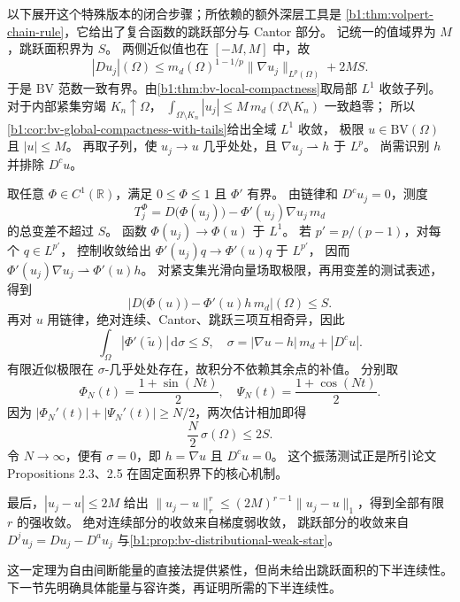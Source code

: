 \begin{proofsketch}
以下展开这个特殊版本的闭合步骤；所依赖的额外深层工具是
\cref{b1:thm:volpert-chain-rule}，它给出了复合函数的跳跃部分与 Cantor 部分。
记统一的值域界为 \(M\)，跳跃面积界为 \(S\)。
两侧近似值也在 \([-M,M]\) 中，故
\[
 |Du_j|(\Omega)
 \le m_d(\Omega)^{1-1/p}\|\nabla u_j\|_{L^p(\Omega)}
      +2M S.
\]
于是 \(\mathrm{BV}\) 范数一致有界。由\cref{b1:thm:bv-local-compactness}取局部 \(L^1\) 收敛子列。
对于内部紧集穷竭 \(K_n\uparrow\Omega\)，
\(\int_{\Omega\setminus K_n}|u_j|\le M\,m_d(\Omega\setminus K_n)\) 一致趋零；
所以\cref{b1:cor:bv-global-compactness-with-tails}给出全域 \(L^1\) 收敛，
极限 \(u\in \mathrm{BV}(\Omega)\) 且 \(|u|\le M\)。
再取子列，使 \(u_j\to u\) 几乎处处，且 \(\nabla u_j\rightharpoonup h\) 于 \(L^p\)。
尚需识别 \(h\) 并排除 \(D^cu\)。

取任意 \(\Phi\in C^1(\mathbb R)\)，满足 \(0\le\Phi\le1\) 且 \(\Phi'\) 有界。
由链律和 \(D^cu_j=0\)，测度
\[
 T_j^\Phi=D\bigl(\Phi(u_j)\bigr)-\Phi'(u_j)\nabla u_j\,m_d
\]
的总变差不超过 \(S\)。
函数 \(\Phi(u_j)\to\Phi(u)\) 于 \(L^1\)。
若 \(p'=p/(p-1)\)，对每个 \(q\in L^{p'}\)，
控制收敛给出
\(\Phi'(u_j)q\to\Phi'(u)q\) 于 \(L^{p'}\)，
因而 \(\Phi'(u_j)\nabla u_j\rightharpoonup\Phi'(u)h\)。
对紧支集光滑向量场取极限，再用变差的测试表述，得到
\[
 \left|D\bigl(\Phi(u)\bigr)-\Phi'(u)h\,m_d\right|(\Omega)\le S.
\]
再对 \(u\) 用链律，绝对连续、Cantor、跳跃三项互相奇异，因此
\[
 \int_\Omega|\Phi'(\widetilde u)|\,\mathrm d\sigma\le S,
 \quad
 \sigma=|\nabla u-h|\,m_d+|D^cu|.
\]
有限近似极限在 \(\sigma\)-几乎处处存在，故积分不依赖其余点的补值。
分别取
\[
 \Phi_N(t)=\frac{1+\sin(Nt)}2,\quad
 \Psi_N(t)=\frac{1+\cos(Nt)}2.
\]
因为 \(|\Phi_N'(t)|+|\Psi_N'(t)|\ge N/2\)，两次估计相加即得
\[
 \frac N2\,\sigma(\Omega)\le2S.
\]
令 \(N\to\infty\)，便有 \(\sigma=0\)，即 \(h=\nabla u\) 且 \(D^cu=0\)。
这个振荡测试正是所引论文 Propositions 2.3、2.5 在固定面积界下的核心机制。

最后，\(|u_j-u|\le2M\) 给出
\(\|u_j-u\|_r^r\le(2M)^{r-1}\|u_j-u\|_1\)，得到全部有限 \(r\) 的强收敛。
绝对连续部分的收敛来自梯度弱收敛，
跳跃部分的收敛来自 \(D^ju_j=Du_j-D^au_j\)
与\cref{b1:prop:bv-distributional-weak-star}。
\end{proofsketch}

这一定理为自由间断能量的直接法提供紧性，但尚未给出跳跃面积的下半连续性。
下一节先明确具体能量与容许类，再证明所需的下半连续性。
